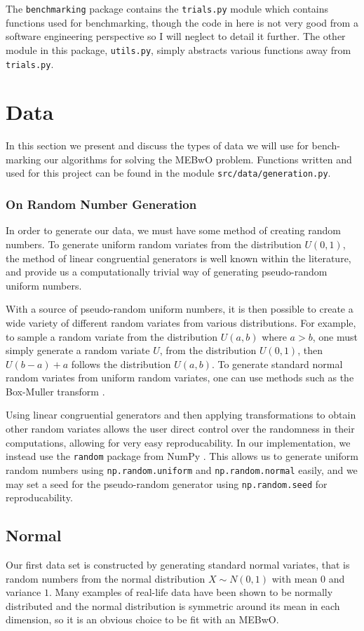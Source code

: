 \documentclass[11pt,twoside]{report}
\theoremstyle{definition}
\numberwithin{theorem}{section}
\numberwithin{definition}{section}
\numberwithin{lemma}{section}
\numberwithin{proposition}{section}
\numberwithin{equation}{section}
\numberwithin{figure}{section}
\begin{document}
The \texttt{benchmarking} package contains the \texttt{trials.py} module which contains functions used for benchmarking, though the code in here is not very good from a software engineering perspective so I will neglect to detail it further. The other module in this package, \texttt{utils.py}, simply abstracts various functions away from \texttt{trials.py}.

\section{Data}\label{data}
In this section we present and discuss the types of data we will use for bench-marking our algorithms for solving the MEBwO problem. Functions written and used for this project can be found in the module \texttt{src/data/generation.py}.

\subsubsection{On Random Number Generation}
In order to generate our data, we must have some method of creating random numbers. To generate uniform random variates from the distribution $U(0,1)$, the method of linear congruential generators \cite{lcg1,lcg2} is well known within the literature, and provide us a computationally trivial way of generating pseudo-random uniform numbers.

With a source of pseudo-random uniform numbers, it is then possible to create a wide variety of different random variates from various distributions. For example, to sample a random variate from the distribution $U(a,b)$ where $a>b$, one must simply generate a random variate $U$, from the distribution $U(0,1)$, then $U(b-a)+a$ follows the distribution $U(a,b)$. To generate standard normal random variates from uniform random variates, one can use methods such as the Box-Muller transform \cite{boxmuller}.

Using linear congruential generators and then applying transformations to obtain other random variates allows the user direct control over the randomness in their computations, allowing for very easy reproducability. In our implementation, we instead use the \texttt{random} package from NumPy \cite{numpy}. This allows us to generate uniform random numbers using \texttt{np.random.uniform} and \texttt{np.random.normal} easily, and we may set a seed for the pseudo-random generator using \texttt{np.random.seed} for reproducability.


\subsection{Normal}
Our first data set is constructed by generating standard normal variates, that is random numbers from the normal distribution $X\sim N(0,1)$ with mean $0$ and variance $1$. Many examples of real-life data have been shown to be normally distributed and the normal distribution is symmetric around its mean in each dimension, so it is an obvious choice to be fit with an MEBwO.
\end{document}
